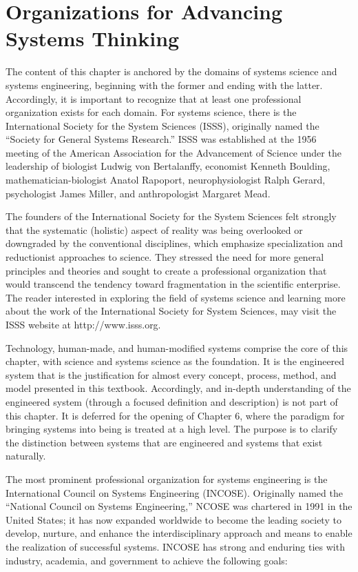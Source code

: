 \section{Organizations for Advancing Systems Thinking}

The content of this chapter is anchored by the domains of systems science and systems engineering, beginning with the former and ending with the latter. Accordingly, it is important to recognize that at least one professional organization exists for each domain. For systems science, there is the International Society for the System Sciences (ISSS), originally named the ``Society for General Systems Research.'' ISSS was established at the 1956 meeting of the American Association for the Advancement of Science under the leadership of biologist Ludwig von Bertalanffy, economist Kenneth Boulding, mathematician-biologist Anatol Rapoport, neurophysiologist Ralph Gerard, psychologist James Miller, and anthropologist Margaret Mead.

The founders of the International Society for the System Sciences felt strongly that the systematic (holistic) aspect of reality was being overlooked or downgraded by the conventional disciplines, which emphasize specialization and reductionist approaches to science. They stressed the need for more general principles and theories and sought to create a professional organization that would transcend the tendency toward fragmentation in the scientific enterprise. The reader interested in exploring the field of systems science and learning more about the work of the International Society for System Sciences, may visit the ISSS website at http://www.isss.org.

Technology, human-made, and human-modified systems comprise the core of this chapter, with science and systems science as the foundation. It is the engineered system that is the justification for almost every concept, process, method, and model presented in this textbook. Accordingly, and in-depth understanding of the engineered system (through a focused definition and description) is not part of this chapter. It is deferred for the opening of Chapter 6, where the paradigm for bringing systems into being is treated at a high level. The purpose is to clarify the distinction between systems that are engineered and systems that exist naturally.

The most prominent professional organization for systems engineering is the International Council on Systems Engineering (INCOSE). Originally named the ``National Council on Systems Engineering,'' NCOSE was chartered in 1991 in the United States; it has now expanded worldwide to become the leading society to develop, nurture, and enhance the interdisciplinary approach and means to enable the realization of successful systems. INCOSE has strong and enduring ties with industry, academia, and government to achieve the following goals:

